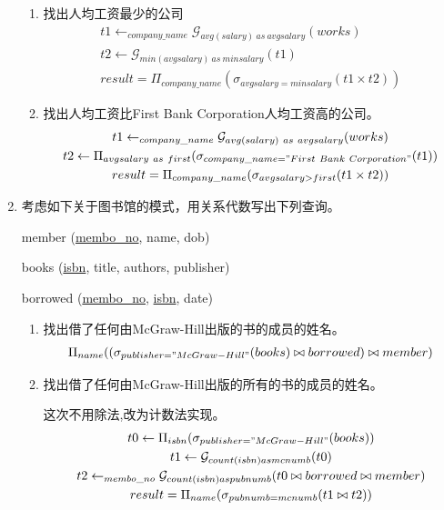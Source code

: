 \documentclass{dingjia}
\begin{document}
\begin{enumerate}
\begin{enumerate}
  \item 找出人均工资最少的公司
    \begin{gather*}
      t1 \leftarrow _{company\_name}\mathcal{G}_{avg(salary)\ as\ avgsalary}(works) \\
      t2 \leftarrow \mathcal{G}_{min(avgsalary)\ as\ minsalary}(t1) \\
      result = \Pi_{company\_name}(\sigma_{avgsalary = minsalary}(t1 \times t2))
    \end{gather*}

  \item 找出人均工资比First Bank Corporation人均工资高的公司。
    \begin{gather*}
      t1 \leftarrow _{company\_name}\mathcal{G}_{avg(salary)\ as\ avgsalary}(works) \\
      t2 \leftarrow \Pi_{avgsalary\ as\ first}(\sigma_{company\_name = "First\ Bank\ Corporation"}(t1)) \\
      result = \Pi_{company\_name}(\sigma_{avgsalary > first}(t1 \times t2))
    \end{gather*}
  \end{enumerate}

\item 考虑如下关于图书馆的模式，用关系代数写出下列查询。

  member (\underline{membo\_no}, name, dob)

  books (\underline{isbn}, title, authors, publisher)

  borrowed (\underline{membo\_no}, \underline{isbn}, date)

  \begin{enumerate}
  \item 找出借了任何由McGraw-Hill出版的书的成员的姓名。
    \begin{gather*}
      \Pi_{name}((\sigma_{publisher = "McGraw-Hill"}(books) \bowtie borrowed) \bowtie member)
    \end{gather*}

  \item 找出借了任何由McGraw-Hill出版的所有的书的成员的姓名。

    这次不用除法,改为计数法实现。
    \begin{gather*}
      t0 \leftarrow \Pi_{isbn}(\sigma_{publisher = "McGraw-Hill"}(books)) \\
      t1 \leftarrow \mathcal{G}_{count(isbn) as mcnumb}(t0) \\
      t2 \leftarrow _{membo\_no}\mathcal{G}_{count(isbn) as pubnumb}(t0 \bowtie borrowed \bowtie member) \\
      result = \Pi_{name}(\sigma_{pubnumb = mcnumb}(t1 \bowtie t2))
    \end{gather*}


\end{enumerate}
\end{enumerate}
\end{document}
